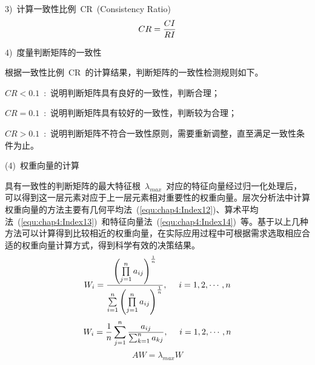 3)~计算一致性比例~CR~(Consistency Ratio)
\begin{equation}\label{equ:chap4:Index11}
    CR=\displaystyle\frac{CI}{RI}
\end{equation}

4)~度量判断矩阵的一致性

根据一致性比例~CR~的计算结果，判断矩阵的一致性检测规则如下。

$CR<0.1$~:~说明判断矩阵具有良好的一致性，判断合理；

$CR=0.1$~:~说明判断矩阵具有较好的一致性，判断较为合理；

$CR>0.1$~:~说明判断矩阵不符合一致性原则，需要重新调整，直至满足一致性条件为止。

(4)~权重向量的计算

具有一致性的判断矩阵的最大特征根~$\lambda_{max}$~对应的特征向量经过归一化处理后，可以得到这一层元素对应于上一层元素相对重要性的权重向量。层次分析法中计算权重向量的方法主要有几何平均法~(\ref{equ:chap4:Index12})、算术平均法~(\ref{equ:chap4:Index13})~和特征向量法~(\ref{equ:chap4:Index14})~等。基于以上几种方法可以计算得到比较相近的权重向量，在实际应用过程中可根据需求选取相应合适的权重向量计算方式，得到科学有效的决策结果。
\begin{equation}\label{equ:chap4:Index12}
    W_i=\displaystyle\frac{\left(\prod\limits_{j=1}^{n}a_{ij}\right)^{\frac{1}{n}}}{\sum\limits_{i=1}^{n}\left(\prod\limits_{j=1}^{n}a_{ij}\right)^{\frac{1}{n}}},~~~~i=1,2,\cdots,n
\end{equation}
\begin{equation}\label{equ:chap4:Index13}
    W_i=\displaystyle\frac{1}{n}\sum_{j=1}^{n}\displaystyle\frac{a_{ij}}{\sum_{k=1}^{n}a_{kj}},~~~~i=1,2,\cdots,n
\end{equation}
\begin{equation}\label{equ:chap4:Index14}
    AW=\lambda_{max}W
\end{equation}
